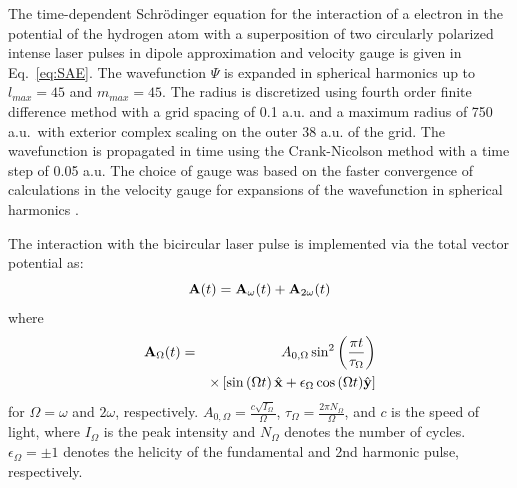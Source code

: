 

The time-dependent Schr\"odinger equation for the interaction of a electron in the potential of the hydrogen atom with a superposition of two circularly polarized intense laser pulses in dipole approximation and velocity gauge is given in Eq.~\ref{eq:SAE}.
%
The wavefunction $\Psi$ is expanded in spherical harmonics up to $l_{max} = 45$ and  $m_{max} = 45$. The radius is discretized using fourth order finite difference method with a grid spacing of 0.1 a.u. and a maximum radius of 750 a.u.\ with exterior complex scaling on the outer 38 a.u. of the grid. The wavefunction is propagated in time using the Crank-Nicolson method with a time step of 0.05 a.u. The choice of gauge was based on the faster convergence of calculations in the velocity gauge for expansions of the wavefunction in spherical harmonics \cite{cormier1996,han2010}. 

The interaction with the bicircular laser pulse is implemented via the total vector potential as:
\begin{equation}
{\bf A}(t) = {\bf A}_{\omega}(t) + {\bf A}_{2\omega}(t)
\end{equation}
where
\begin{eqnarray}
{\bf A}_\Omega(t) &=& A_{0,\Omega} \sin^2\left(\frac{\pi t}{\tau_{\Omega}}\right)
    \nonumber
      \\
      && \times \left[ 
      \sin\left(\Omega t \right) {\hat{\bf x} + \epsilon_{\Omega}\cos\left(\Omega t \right)} {\hat{\bf y}} \right]
\end{eqnarray}
for $\Omega = \omega$ and $2\omega$, respectively. $A_{0,\Omega} = \frac{c\sqrt{I_\Omega}}{\Omega}$, $\tau_{\Omega} = \frac{2\pi N_{\Omega}}{\Omega}$, and $c$ is the speed of light, where $I_{\Omega}$ is the peak intensity and $N_{\Omega}$ denotes the number of cycles. $\epsilon_{\Omega} = \pm 1$ denotes the helicity of the fundamental and 2nd harmonic pulse, respectively. 

